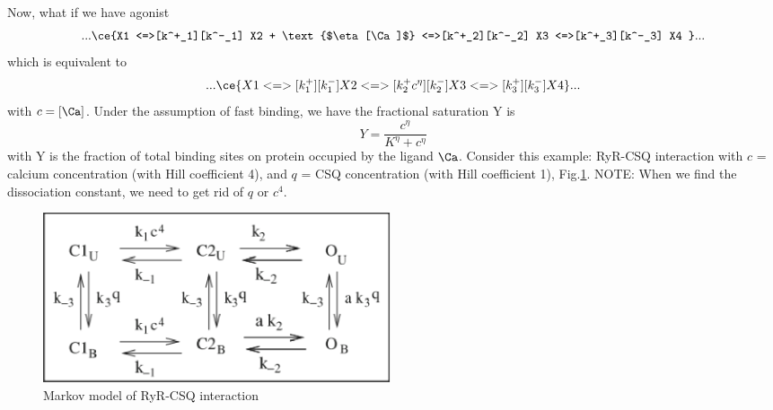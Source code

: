 Now, what if we have agonist
\begin{equation}
  ...\ce{X1 <=>[k^+_1][k^-_1] X2 + \text{$\eta [\Ca]$}
  <=>[k^+_2][k^-_2] X3 <=>[k^+_3][k^-_3] X4 } ...
\end{equation}
which is equivalent to
\begin{equation}
  ...\ce{X1 <=>[k^+_1][k^-_1] X2 <=>[k^+_2 c^{\eta}][k^-_2] X3
  <=>[k^+_3][k^-_3] X4 }...
\end{equation}
with $c = [\Ca]$. Under the assumption of fast binding,
we have the fractional saturation Y is
\begin{equation}
Y = \frac{c^\eta}{K^\eta + c^\eta}
\end{equation}
with Y is the fraction of total binding sites on protein occupied by the ligand
$\Ca$. Consider this example: RyR-CSQ interaction with $c$ = calcium
concentration (with Hill coefficient 4), and $q$ = CSQ concentration (with Hill
coefficient 1), Fig.\ref{fig:Tania_RyR-CSQ}. NOTE: When we find the dissociation
constant, we need to get rid of $q$ or $c^4$.

\begin{figure}[hbt]
 \centerline{\includegraphics[height=5cm]{./images/Tania_RyR_CSQ.eps}}
\caption{Markov model of RyR-CSQ interaction}
\label{fig:Tania_RyR-CSQ}
\end{figure}

